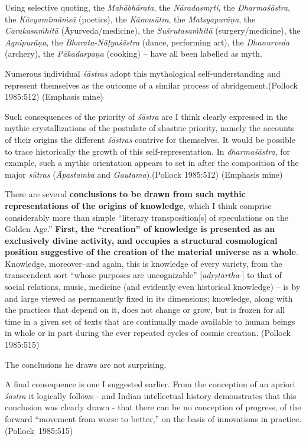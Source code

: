 Using  selective quoting, the {\sl Mahābhārata}, the {\sl Nāradasmṛti},  the {\sl Dharmaśāstra},  the {\sl Kāvyamīmāṁsā} (poetics), the {\sl Kāmasūtra},  the {\sl Matsyapurāṇa},  the {\sl Carakasaṁhitā} (Āyurveda/medicine),  the {\sl Suśrutasaṁhitā} (surgery/\-medicine),  the {\sl Agnipurāṇa}, the {\sl Bharata-Nāṭyaśāstra} (dance, performing art), the {\sl Dhanurveda} (archery), the {\sl Pākadarpaṇa} (cooking) -- have all been labelled as myth.
\begin{myquote}
Numerous individual {\sl śāstras} adopt this mythological self-understanding and represent themselves as the outcome of a similar process of abridgement.\hfill	(Pollock 1985:512) (Emphasis mine)

\smallskip

Such consequences of the priority of {\sl śāstra} are I think clearly expressed in the mythic crystallizations of the postulate of shastric priority, namely the accounts of their origins the different {\sl śāstras} contrive for themselves. It would be possible to trace historically the growth of this self-representation. In {\sl dharmaśāstra}, for example, such a mythic orientation appears to set in after the composition of the major {\sl sūtras} ({\sl Āpastamba} and {\sl Gautama}).\hfill (Pollock 1985:512) (Emphasis mine)

\smallskip

There are several {\bf conclusions to be drawn from such mythic representations of the origins of knowledge}, which I think comprise considerably more than simple ``literary transposition[s] of speculations on the Golden Age.'' {\bf First, the ``creation'' of knowledge is presented as an exclusively divine activity, and occupies a structural cosmological position suggestive of the creation of the material universe as a whole}. Knowledge, moreover--and again, this is knowledge of every variety, from the transcendent sort ``whose purposes are uncognizable'' [{\sl adṛṣṭārtha}-] to that of social relations, music, medicine (and evidently even historical knowledge) -- is by and large viewed as permanently fixed in its dimensions; knowledge, along with the practices that depend on it, does not change or grow, but is frozen for all time in a given set of texts that are continually made available to human beings in whole or in part during the ever repeated cycles of cosmic creation. \hfill (Pollock 1985:515)
\end{myquote}

The conclusions he draws are not surprising, 
\begin{myquote}
A final consequence is one I suggested earlier. From the conception of an apriori {\sl śāstra} it logically follows - and Indian intellectual history demonstrates that this conclusion was clearly drawn - that there can be no conception of progress, of the forward ``movement from worse to better,'' on the basis of innovations in practice. 
\hfill \hbox{(Pollock 1985:515)}
\end{myquote}

